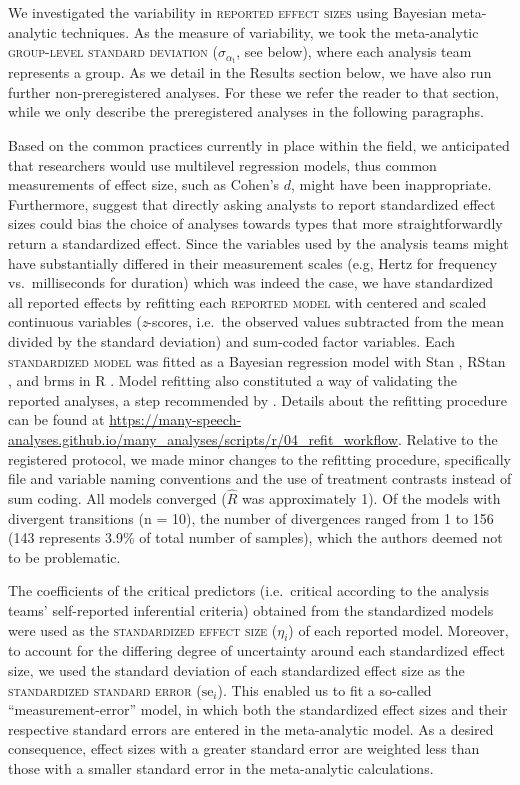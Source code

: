 \documentclass[Review,times,sageh]{sagej}
\begin{document}
We investigated the variability in \textsc{reported effect sizes} using Bayesian meta-analytic techniques.
As the measure of variability, we took the meta-analytic \textsc{group-level standard deviation} (\(\sigma_{\alpha_{\text{t}}}\), see below), where each analysis team represents a group.
As we detail in the Results section below, we have also run further non-preregistered analyses.
For these we refer the reader to that section, while we only describe the preregistered analyses in the following paragraphs.

Based on the common practices currently in place within the field, we anticipated that researchers would use multilevel regression models, thus common measurements of effect size, such as Cohen's \(d\), might have been inappropriate.
Furthermore, \citet{aczel2021} suggest that directly asking analysts to report standardized effect sizes could bias the choice of analyses towards types that more straightforwardly return a standardized effect.
Since the variables used by the analysis teams might have substantially differed in their measurement scales (e.g, Hertz for frequency vs.~milliseconds for duration) which was indeed the case, we have standardized all reported effects by refitting each \textsc{reported model} with centered and scaled continuous variables (\emph{z}-scores, i.e.~the observed values subtracted from the mean divided by the standard deviation) and sum-coded factor variables.
Each \textsc{standardized model} was fitted as a Bayesian regression model with Stan \citep{stan2021}, RStan \citep{stan2020a}, and brms \citep{burkner2017} in R \citep{R-base}.
Model refitting also constituted a way of validating the reported analyses, a step recommended by \citet{aczel2021}.
Details about the refitting procedure can be found at \url{https://many-speech-analyses.github.io/many_analyses/scripts/r/04_refit_workflow}.
Relative to the registered protocol, we made minor changes to the refitting procedure, specifically file and variable naming conventions and the use of treatment contrasts instead of sum coding.
All models converged (\(\hat{R}\) was approximately 1).
Of the models with divergent transitions (n = 10), the number of divergences ranged from 1 to 156 (143 represents 3.9\% of total number of samples), which the authors deemed not to be problematic.

The coefficients of the critical predictors (i.e.~critical according to the analysis teams' self-reported inferential criteria) obtained from the standardized models were used as the \textsc{standardized effect size} (\(\eta_i\)) of each reported model.
Moreover, to account for the differing degree of uncertainty around each standardized effect size, we used the standard deviation of each standardized effect size as the \textsc{standardized standard error} (\(\text{se}_i\)).
This enabled us to fit a so-called ``measurement-error'' model, in which both the standardized effect sizes and their respective standard errors are entered in the meta-analytic model.
As a desired consequence, effect sizes with a greater standard error are weighted less than those with a smaller standard error in the meta-analytic calculations.
\end{document}
